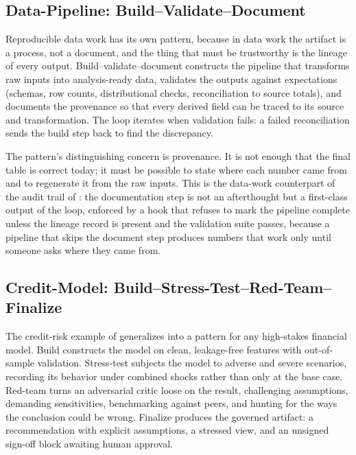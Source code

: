 \subsection{Data-Pipeline: Build--Validate--Document}\label{subsec:pattern-data-pipeline}

Reproducible data work has its own pattern, because in data work the artifact is a
process, not a document, and the thing that must be trustworthy is the lineage of
every output. Build--validate--document constructs the pipeline that transforms
raw inputs into analysis-ready data, validates the outputs against expectations
(schemas, row counts, distributional checks, reconciliation to source totals),
and documents the provenance so that every derived field can be traced to its
source and transformation. The loop iterates when validation fails: a failed
reconciliation sends the build step back to find the discrepancy.

The pattern's distinguishing concern is provenance. It is not enough that the
final table is correct today; it must be possible to state where each number came
from and to regenerate it from the raw inputs. This is the data-work counterpart
of the audit trail of : the documentation step is not
an afterthought but a first-class output of the loop, enforced by a hook that
refuses to mark the pipeline complete unless the lineage record is present and
the validation suite passes, because a pipeline that skips the document step
produces numbers that work only until someone asks where they came from.

\subsection{Credit-Model: Build--Stress-Test--Red-Team--Finalize}\label{subsec:pattern-credit-model}

The credit-risk example of  generalizes into a
pattern for any high-stakes financial model. Build constructs the model on clean,
leakage-free features with out-of-sample validation. Stress-test subjects the
model to adverse and severe scenarios, recording its behavior under combined
shocks rather than only at the base case. Red-team turns an adversarial critic
loose on the result, challenging assumptions, demanding sensitivities,
benchmarking against peers, and hunting for the ways the conclusion could be wrong.
Finalize produces the governed artifact: a recommendation with explicit
assumptions, a stressed view, and an unsigned sign-off block awaiting human
approval.

